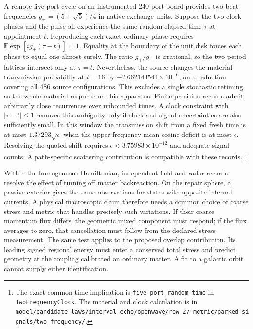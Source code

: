 \documentclass[11pt]{article}
\begin{document}
A remote five-port cycle on an instrumented 240-port board provides
two beat frequencies $g_\pm=(5\pm\sqrt{5})/4$ in native exchange
units. Suppose the two clock phases and the pulse all experience the same
random elapsed time $\tau$ at appointment $t$. Reproducing each exact
ordinary phase requires $\mathbb{E}\exp[i g_\pm(\tau-t)]=1$.
Equality at the boundary of the unit disk forces each phase to equal
one almost surely. The ratio $g_+/g_-$ is irrational, so the two
period lattices intersect only at $\tau=t$. Nevertheless, the source
changes the material transmission probability at $t=16$ by
$-2.662143544\times10^{-6}$, on a reduction covering all 486 source
configurations. This excludes a single stochastic retiming as the
whole material response on this apparatus. Finite-precision records
admit arbitrarily close recurrences over unbounded times. A clock
constraint with $|\tau-t|\le1$ removes this ambiguity only if clock
and signal uncertainties are also sufficiently small. In this window the
transmission shift from a fixed fresh time is at most $1.37293\sqrt{\epsilon}$
when the upper-frequency mean cosine deficit is at most $\epsilon$.
Resolving the quoted shift requires $\epsilon<3.75983\times10^{-12}$
and adequate signal counts. A path-specific scattering contribution is
compatible with these records.%
\footnote{The exact common-time implication is \texttt{five\_port\_random\_time}
in \texttt{TwoFrequencyClock}. The material and clock calculation is in
\nolinkurl{model/candidate_laws/interval_echo/openwave/row_27_metric/parked_signals/two_frequency/}.}

Within the homogeneous Hamiltonian, independent field and radar records
resolve the effect of turning off matter backreaction. On the repair
sphere, a passive exterior gives the same observations for states with
opposite internal currents. A physical macroscopic claim therefore needs
a common choice of coarse stress and metric that handles precisely such
variations. If their coarse momentum flux differs, the geometric mixed
component must respond; if the flux averages to zero, that cancellation
must follow from the declared stress measurement. The same test applies
to the proposed overlap contribution. Its leading signed regional energy
must enter a conserved total stress and predict geometry at the coupling
calibrated on ordinary matter. A fit to a galactic orbit cannot supply
either identification.
\end{document}
